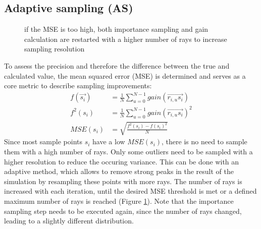 \subsection{Adaptive sampling (AS)}
\label{subsec:adaptive_sampling}
\begin{figure}[H]
  \centerline
  {}
  \caption{if the MSE is too high, both importance sampling and gain calculation
  are restarted with a higher number of rays to increase sampling resolution}
  \label{graphic:pap3}
\end{figure}
To assess the precision
and therefore the difference between the true and calculated value,
the mean squared error (MSE) is determined and serves as a core metric to
describe sampling improvements:
\begin{align}
     f(\vec{s_i}) &= \frac{1}{N} \sum_{u=0}^{N-1} gain(\overrightarrow{r_{i,u}s_i})\\
     f^2(s_i)     &= \frac{1}{N} \sum_{u=0}^{N-1} gain(\overrightarrow{r_{i,u}s_i})^2\\
     MSE(s_i)     &= \sqrt{\frac{f^2(s_i) - f(s_i)^2}{N}}
\end{align}
Since most sample points $s_i$ have a low $MSE(s_i)$, there is no need
to sample them with a high number of rays. Only some outliers need to
be sampled with a higher resolution to reduce the occuring variance. This can be done with an adaptive
method, which allows to remove strong peaks in the result
of the simulation by resampling these points with more rays. The number of rays
is increased with each iteration, until the desired MSE threshold is met or 
a defined maximum number of rays is reached (Figure \ref{graphic:pap3}).
Note that the importance sampling step needs to be executed again, since
the number of rays changed, leading to a slightly different distribution.


